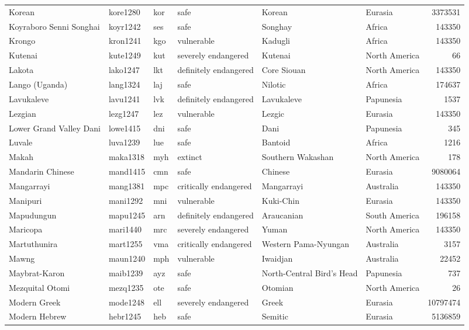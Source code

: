 \begin{longtable}{llllllr}
  Korean & kore1280 & kor & safe & Korean & Eurasia & 3373531 \\ 
  Koyraboro Senni Songhai & koyr1242 & ses & safe & Songhay & Africa & 143350 \\ 
  Krongo & kron1241 & kgo & vulnerable & Kadugli & Africa & 143350 \\ 
  Kutenai & kute1249 & kut & severely endangered & Kutenai & North America & 66 \\ 
  Lakota & lako1247 & lkt & definitely endangered & Core Siouan & North America & 143350 \\ 
  Lango (Uganda) & lang1324 & laj & safe & Nilotic & Africa & 174637 \\ 
  Lavukaleve & lavu1241 & lvk & definitely endangered & Lavukaleve & Papunesia & 1537 \\ 
  Lezgian & lezg1247 & lez & vulnerable & Lezgic & Eurasia & 143350 \\ 
  Lower Grand Valley Dani & lowe1415 & dni & safe & Dani & Papunesia & 345 \\ 
  Luvale & luva1239 & lue & safe & Bantoid & Africa & 1216 \\ 
  Makah & maka1318 & myh & extinct & Southern Wakashan & North America & 178 \\ 
  Mandarin Chinese & mand1415 & cmn & safe & Chinese & Eurasia & 9080064 \\ 
  Mangarrayi & mang1381 & mpc & critically endangered & Mangarrayi & Australia & 143350 \\ 
  Manipuri & mani1292 & mni & vulnerable & Kuki-Chin & Eurasia & 143350 \\ 
  Mapudungun & mapu1245 & arn & definitely endangered & Araucanian & South America & 196158 \\ 
  Maricopa & mari1440 & mrc & severely endangered & Yuman & North America & 143350 \\ 
  Martuthunira & mart1255 & vma & critically endangered & Western Pama-Nyungan & Australia & 3157 \\ 
  Mawng & maun1240 & mph & vulnerable & Iwaidjan & Australia & 22452 \\ 
  Maybrat-Karon & maib1239 & ayz & safe & North-Central Bird's Head & Papunesia & 737 \\ 
  Mezquital Otomi & mezq1235 & ote & safe & Otomian & North America & 26 \\ 
  Modern Greek & mode1248 & ell & severely endangered & Greek & Eurasia & 10797474 \\ 
  Modern Hebrew & hebr1245 & heb & safe & Semitic & Eurasia & 5136859 \\ 

\end{longtable}
